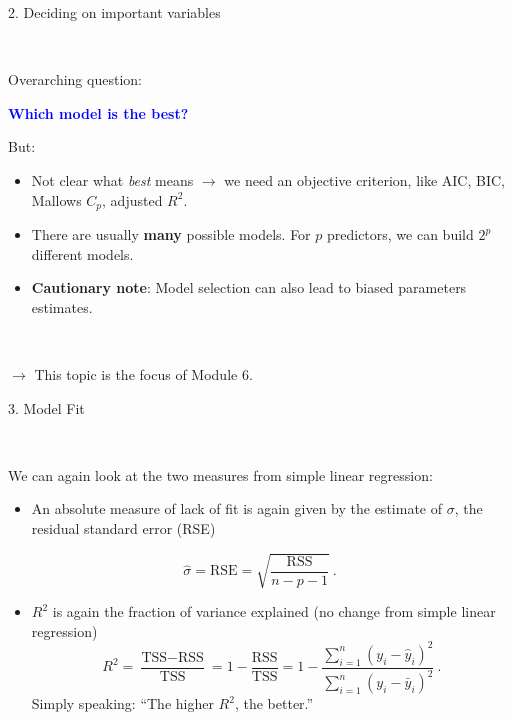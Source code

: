 \documentclass[10pt,ignorenonframetext,]{beamer}
\providecommand{\tightlist}{%
  \setlength{\itemsep}{0pt}\setlength{\parskip}{0pt}}
\begin{document}
\begin{frame}

\begin{block}{2. Deciding on important variables}

\(~\)

Overarching question:

\begin{center}
 \textcolor{blue}{\bf Which model is the best?}
\end{center}

But:

\begin{itemize}
\item
  Not clear what \emph{best} means \(\rightarrow\) we need an objective
  criterion, like AIC, BIC, Mallows \(C_p\), adjusted \(R^2\).
\item
  There are usually \textbf{many} possible models. For \(p\) predictors,
  we can build \(2^p\) different models.
\item
  \textbf{Cautionary note}: Model selection can also lead to biased
  parameters estimates.
\end{itemize}

\(~\)

\(\rightarrow\) This topic is the focus of Module 6.

\end{block}

\end{frame}

\begin{frame}

\begin{block}{3. Model Fit}

\(~\)

We can again look at the two measures from simple linear regression:

\begin{itemize}
\tightlist
\item
  An absolute measure of lack of fit is again given by the estimate of
  \(\sigma\), the residual standard error (RSE)
\end{itemize}

\[\hat\sigma = \text{RSE}= \sqrt{ \frac{ \text{RSS}}{n-p-1}} \ . \]

\begin{itemize}
\tightlist
\item
  \(R^2\) is again the fraction of variance explained (no change from
  simple linear regression)
  \[R^2 = \frac{\text{TSS}-\text{RSS}}{\text{TSS}}= 1-\frac{\text{RSS}}{\text{TSS}}=1-\frac{\sum_{i=1}^n(y_i-\hat{y}_i)^2}{\sum_{i=1}^n(y_i-\bar{y}_i)^2} \ .\]
  Simply speaking: ``The higher \(R^2\), the better.''
\end{itemize}

\end{block}

\end{frame}
\end{document}

